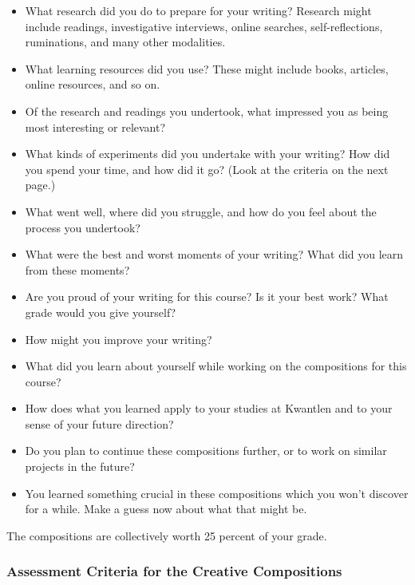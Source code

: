 \documentclass[letterpaper,10pt,headsepline]{scrreprt}
\begin{document}
 \begin{itemize}
\item What research did you do to prepare for your writing? Research might include readings, investigative interviews, online searches, self-reflections, ruminations, and many other modalities. 

\item What learning resources did you use? These might include books, articles, online resources, and so on.

\item Of the research and readings you undertook, what impressed you as being most interesting or relevant?

\item What kinds of experiments did you undertake with your writing? How did you spend your time, and how did it go? (Look at the criteria on the next page.)

\item What went well, where did you struggle, and how do you feel about the process you undertook?

\item What were the best and worst moments of your writing? What did you learn from these moments?

\item Are you proud of your writing for this course? Is it your best work? What grade would you give yourself?

\item How might you improve your writing?

\item What did you learn about yourself while working on the compositions for this course?

\item How does what you learned apply to your studies at Kwantlen and to your sense of your future direction?

\item Do you plan to continue these compositions further, or to work on similar projects in the future?

\item You learned something crucial in these compositions which you won't discover for a while. Make a guess now about what that might be.

\end{itemize}

The compositions are collectively worth 25 percent of your grade.

\subsubsection{Assessment Criteria for the Creative Compositions}
\end{document}

